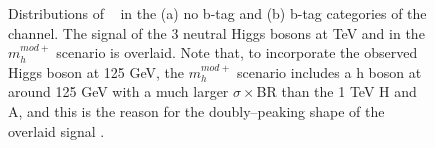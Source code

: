 \begin{figure}[h!]
\begin{center}
\end{center}
\caption{Distributions of \mTtot~ in the (a) no b-tag and (b) b-tag categories 
of the \mutau channel. The signal of the 3 neutral Higgs bosons at  TeV 
and  in the $m_{h}^{mod+}$ scenario is overlaid. Note that, to incorporate
the observed Higgs boson at 125 GeV, the $m_{h}^{mod+}$ scenario includes a h boson
at around 125 GeV with a much larger $\sigma \times$BR than the 1 TeV H and A, and this is
the reason for the doubly--peaking shape of the overlaid signal \cite{CMS-PAS-HIG-16-037}.}
\label{fig:mssm_results_mttot_mt}
\end{figure}

